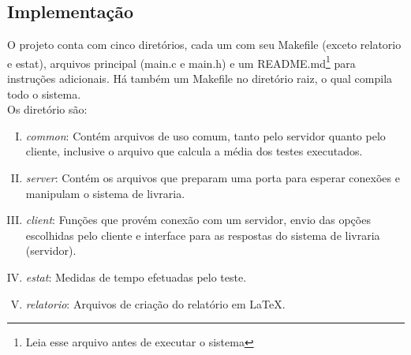 \documentclass[a4paper,10pt]{article}
\begin{document}
\subsection{Implementação}
O projeto conta com cinco diretórios, cada um com seu Makefile (exceto relatorio e estat), arquivos
principal (main.c e main.h) e um README.md\footnote{Leia esse arquivo antes de
executar o sistema} para instruções adicionais. Há também um Makefile no diretório raiz, o qual 
compila todo o sistema.
\\Os diretório são:
\begin{enumerate}[I.]
\label{sec:dirs}
\item \label{itm:common} \emph{common}: Contém arquivos de uso comum, tanto pelo servidor quanto 
pelo cliente, inclusive o arquivo que calcula a média dos testes executados.
\item \label{itm:server} \emph{server}: Contém os arquivos que preparam uma porta para esperar
conexões e manipulam o sistema de livraria.
\item \label{itm:client} \emph{client}: Funções que provém conexão com um servidor, envio das opções
escolhidas pelo cliente e interface para as respostas do sistema de livraria
(servidor).
\item \label{itm:estat} \emph{estat}: Medidas de tempo efetuadas pelo teste.
\item \label{itm:relatorio} \emph{relatorio}: Arquivos de criação do relatório em LaTeX.
\end{enumerate}
\end{document}
